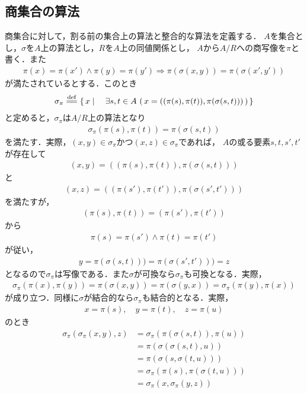 \subsection{商集合の算法}
	商集合に対して，割る前の集合上の算法と整合的な算法を定義する．
	$A$を集合とし，$\sigma$を$A$上の算法とし，$R$を$A$上の同値関係とし，
	$A$から$A/R$への商写像を$\pi$と書く．また
	\begin{align}
		\pi(x) = \pi(x') \wedge \pi(y) = \pi(y')
		\Longrightarrow \pi\left(\sigma(x,y)\right) = \pi\left(\sigma(x',y')\right)
	\end{align}
	が満たされているとする．このとき
	\begin{align}
		\sigma_\pi \defeq \Set{x}{\exists s,t \in A\, 
		\left(\, x=((\pi(s),\pi(t)),\pi(\sigma(s,t)))\, \right)}
	\end{align}
	と定めると，$\sigma_\pi$は$A/R$上の算法となり
	\begin{align}
		\sigma_\pi(\pi(s),\pi(t)) = \pi(\sigma(s,t))
	\end{align}
	を満たす．実際，$(x,y) \in \sigma_\pi$かつ$(x,z) \in \sigma_\pi$であれば，
	$A$の或る要素$s,t,s',t'$が存在して
	\begin{align}
		(x,y) = ((\pi(s),\pi(t)),\pi(\sigma(s,t)))
	\end{align}
	と
	\begin{align}
		(x,z) = ((\pi(s'),\pi(t')),\pi(\sigma(s',t')))
	\end{align}
	を満たすが，
	\begin{align}
		(\pi(s),\pi(t)) = (\pi(s'),\pi(t'))
	\end{align}
	から
	\begin{align}
		\pi(s) = \pi(s') \wedge \pi(t) = \pi(t')
	\end{align}
	が従い，
	\begin{align}
		y = \pi(\sigma(s,t))) = \pi(\sigma(s',t'))) = z
	\end{align}
	となるので$\sigma_\pi$は写像である．また$\sigma$が可換なら$\sigma_\pi$も可換となる．実際，
	\begin{align}
		\sigma_\pi(\pi(x),\pi(y)) = \pi(\sigma(x,y))
		= \pi(\sigma(y,x)) = \sigma_\pi(\pi(y),\pi(x))
	\end{align}
	が成り立つ．同様に$\sigma$が結合的なら$\sigma_\pi$も結合的となる．実際，
	\begin{align}
		x = \pi(s),\quad y = \pi(t),\quad z = \pi(u)
	\end{align}
	のとき
	\begin{align}
		\sigma_\pi\left(\sigma_\pi(x,y),z\right)
		&= \sigma_\pi\left(\pi(\sigma(s,t)),\pi(u)\right) \\
		&= \pi\left(\sigma(\sigma(s,t),u)\right) \\
		&= \pi\left(\sigma(s,\sigma(t,u))\right) \\
		&= \sigma_\pi\left(\pi(s),\pi(\sigma(t,u))\right) \\
		&= \sigma_\pi\left(x,\sigma_\pi(y,z)\right)
	\end{align}
